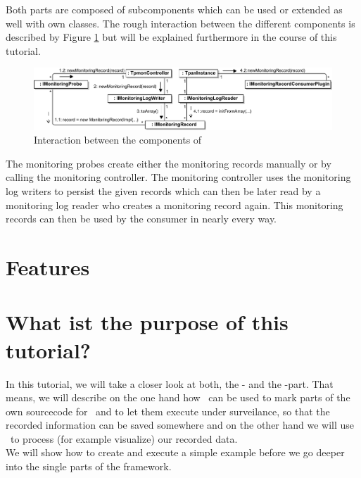     Both parts are composed of subcomponents which can be used or extended as well with own classes. The rough interaction between the different components is described by Figure \ref{image:interactiondiagramofkieker} but will be explained furthermore in the course of this tutorial.
    \begin{figure}[H]
      \begin{center}
	\includegraphics[width=1.0\textwidth]{./images/kiekerCommunications-revisedReArranged-woMonitoringLog-bw.pdf}
	\caption{Interaction between the components of \Kieker}
	\label{image:interactiondiagramofkieker}
      \end{center}
    \end{figure}
    The monitoring probes create either the monitoring records manually or by calling the monitoring controller. The monitoring controller uses the monitoring log writers to persist the given records which can then be later read by a monitoring log reader who creates a monitoring record again. This monitoring records can then be used by the consumer in nearly every way.

  \section{Features}

  \section{What ist the purpose of this tutorial?}
    In this tutorial, we will take a closer look at both, the \textbf{\KiekerMonitoring}- and the \textbf{\KiekerAnalysis}-part. That means, we will describe on the one hand how \KiekerMonitoring\ can be used to mark parts of the own sourcecode for \Kieker\ and to let them execute under surveilance, so that the recorded information can be saved somewhere and on the other hand we will use \KiekerAnalysis\ to process (for example visualize) our recorded data.\\
    We will show how to create and execute a simple example before we go deeper into the single parts of the framework.